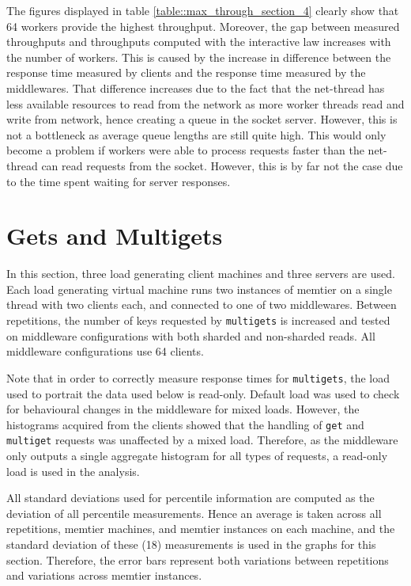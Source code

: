 \documentclass[11pt,a4paper]{article}
\begin{document}
The figures displayed in table \ref{table::max_through_section_4} clearly show that 64 workers provide the highest throughput. Moreover, the gap between measured throughputs and throughputs computed with the interactive law increases with the number of workers. This is caused by the increase in difference between the response time measured by clients and the response time measured by the middlewares. That difference increases due to the fact that the net-thread has less available resources to read from the network as more worker threads read and write from network, hence creating a queue in the socket server. However, this is not a bottleneck as average queue lengths are still quite high. This would only become a problem if workers were able to process requests faster than the net-thread can read requests from the socket. However, this is by far not the case due to the time spent waiting for server responses.

\newpage

\section{Gets and Multigets}
In this section, three load generating client machines and three servers are used. Each load generating virtual machine runs two instances of memtier on a single thread with two clients each, and connected to one of two middlewares. Between repetitions, the number of keys requested by \texttt{multigets} is increased and tested on middleware configurations with both sharded and non-sharded reads. All middleware configurations use 64 clients.

Note that in order to correctly measure response times for \texttt{multigets}, the load used to portrait the data used below is read-only. Default load was used to check for behavioural changes in the middleware for mixed loads. However, the histograms acquired from the clients showed that the handling of \texttt{get} and \texttt{multiget} requests was unaffected by a mixed load. Therefore, as the middleware only outputs a single aggregate histogram for all types of requests, a read-only load is used in the analysis.

All standard deviations used for percentile information are computed as the deviation of all percentile measurements. Hence an average is taken across all repetitions, memtier machines, and memtier instances on each machine, and the standard deviation of these (18) measurements is used in the graphs for this section. Therefore, the error bars represent both variations between repetitions and variations across memtier instances.
\end{document}
